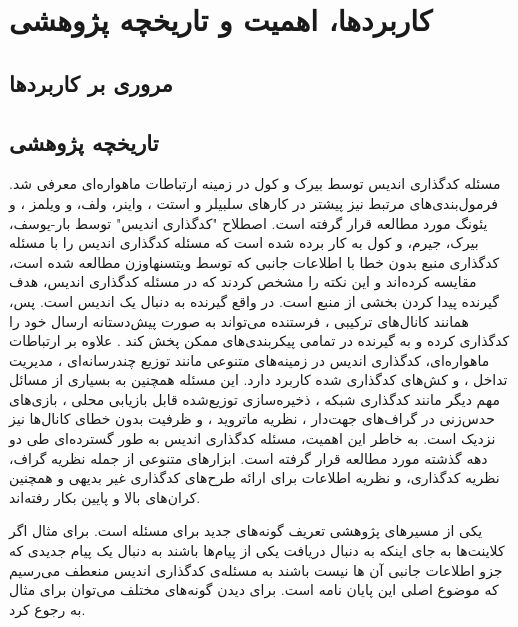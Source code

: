	
\section{
	کاربردها، اهمیت و تاریخچه پژوهشی
	}
\subsection{
	مروری بر کاربردها
}

\subsection{
تاریخچه پژوهشی
}
مسئله کدگذاری اندیس توسط بیرک و کول 
\cite{25, 26}
 در زمینه ارتباطات ماهواره‌ای معرفی شد. فرمول‌بندی‌های مرتبط نیز پیشتر در کارهای سلبیلر و استت
  \cite{paper:1455117:Celebiler}،
   واینر، ولف، و ویلمز 
\cite{152}
، و یئونگ 
\cite{158}
 مورد مطالعه قرار گرفته است. اصطلاح "کدگذاری اندیس" توسط بار-یوسف، بیرک، جیرم، و کول 
\cite{4031356}
 به کار برده شده است که مسئله کدگذاری اندیس را با مسئله کدگذاری منبع بدون خطا با اطلاعات جانبی که توسط ویتسنهاوزن
\cite{1055607}
 مطالعه شده است، مقایسه کرده‌اند و این نکته را مشخص کردند که در مسئله کدگذاری اندیس، هدف گیرنده پیدا کردن بخشی از منبع است. در واقع گیرنده به دنبال یک اندیس است. پس، همانند کانال‌های ترکیبی
 \cite{27, 53, 154}
، فرستنده می‌تواند به صورت پیش‌دستانه ارسال خود را کدگذاری کرده و به گیرنده در تمامی پیکربندی‌های ممکن پخش کند
\cite{48}
. علاوه بر ارتباطات ماهواره‌ای، کدگذاری اندیس در زمینه‌های متنوعی مانند توزیع چندرسانه‌ای 
\cite{114}
، مدیریت تداخل 
\cite{81}
، و  کش‌های کدگذاری شده 
\cite{103, 82}
 کاربرد دارد. این مسئله همچنین به بسیاری از مسائل مهم دیگر مانند کدگذاری شبکه 
\cite{122, 61, 59}
، ذخیره‌سازی توزیع‌شده قابل بازیابی محلی 
\cite{108, 128, 13}
، بازی‌های حدس‌زنی در گراف‌های جهت‌دار 
\cite{122, 162, 13}
، نظریه ماتروید 
\cite{61}
، و ظرفیت بدون خطای کانال‌ها 
\cite{131}
 نیز نزدیک است.
به خاطر این اهمیت، مسئله کدگذاری اندیس به طور گسترده‌ای طی دو دهه گذشته مورد مطالعه قرار گرفته است. ابزارهای متنوعی از جمله نظریه گراف، نظریه کدگذاری، و نظریه اطلاعات برای ارائه طرح‌های کدگذاری غیر بدیهی
\cite{25, 101, 22, 43, 114, 29, 8, 104, 81, 130, 7, 9, 149, 116, 80, 141, 146, 162}
و همچنین کران‌‌های بالا و پایین 
\cite{160, 22, 55, 28, 17, 141}
 بکار رفته‌اند.
 
 یکی از مسیرهای پژوهشی تعریف گونه‌های جدید برای مسئله است. برای مثال اگر کلاینت‌ها به جای اینکه به دنبال دریافت یکی از پیام‌ها باشند  به دنبال یک پیام جدیدی که جزو اطلاعات جانبی آن ها نیست باشند به مسئله‌ی کدگذاری اندیس منعطف می‌رسیم که موضوع اصلی این پایان نامه است. برای  دیدن گونه‌های مختلف می‌توان برای مثال به
 \cite{pliablefirstpaper, verypliable, byrne2023preferential}
 رجوع کرد.
 
